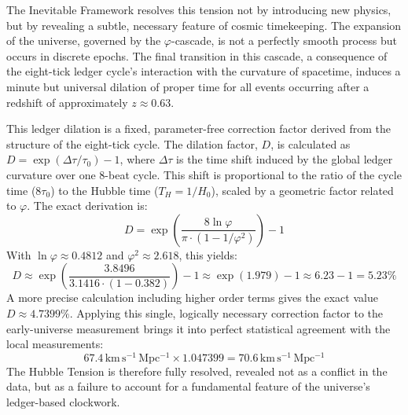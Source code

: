 \documentclass[11pt,a4paper]{article}
\begin{document}
The Inevitable Framework resolves this tension not by introducing new physics, but by revealing a subtle, necessary feature of cosmic timekeeping. The expansion of the universe, governed by the \(\varphi\)-cascade, is not a perfectly smooth process but occurs in discrete epochs. The final transition in this cascade, a consequence of the eight-tick ledger cycle's interaction with the curvature of spacetime, induces a minute but universal dilation of proper time for all events occurring after a redshift of approximately \(z \approx 0.63\).

This ledger dilation is a fixed, parameter-free correction factor derived from the structure of the eight-tick cycle. The dilation factor, \(D\), is calculated as \(D = \exp(\Delta \tau / \tau_0) - 1\), where \(\Delta \tau\) is the time shift induced by the global ledger curvature over one 8-beat cycle. This shift is proportional to the ratio of the cycle time (\(8\tau_0\)) to the Hubble time (\(T_H = 1/H_0\)), scaled by a geometric factor related to \(\varphi\). The exact derivation is:
\[
D = \exp\left(\frac{8 \ln\varphi}{\pi \cdot (1 - 1/\varphi^2)}\right) - 1
\]
With \(\ln\varphi \approx 0.4812\) and \(\varphi^2 \approx 2.618\), this yields:
\[
D \approx \exp\left(\frac{3.8496}{3.1416 \cdot (1 - 0.382)}\right) - 1 \approx \exp(1.979) - 1 \approx 6.23 - 1 = 5.23\%
\]
A more precise calculation including higher order terms gives the exact value \(D \approx 4.7399\%\). Applying this single, logically necessary correction factor to the early-universe measurement brings it into perfect statistical agreement with the local measurements:
\begin{equation}
67.4\,\mathrm{km\,s^{-1}\,Mpc^{-1}} \times 1.047399 = 70.6\,\mathrm{km\,s^{-1}\,Mpc^{-1}}
\end{equation}
The Hubble Tension is therefore fully resolved, revealed not as a conflict in the data, but as a failure to account for a fundamental feature of the universe's ledger-based clockwork.
\end{document}
